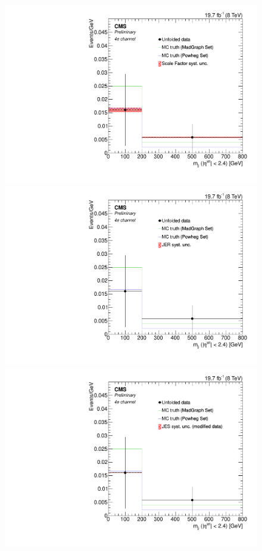 \begin{figure}[hbtp]
\begin{center}
    \includegraphics[width=0.8\cmsFigWidth]{Figures/Unfolding/Systematics/ZZTo4e_CentralMjj_SFSq_Mad_fr}
    \includegraphics[width=0.8\cmsFigWidth]{Figures/Unfolding/Systematics/ZZTo4e_CentralMjj_JER_Mad_fr}
    \includegraphics[width=0.8\cmsFigWidth]{Figures/Unfolding/Systematics/ZZTo4e_CentralMjj_JES_ModData_Mad_fr}     

\end{center}
\end{figure}
